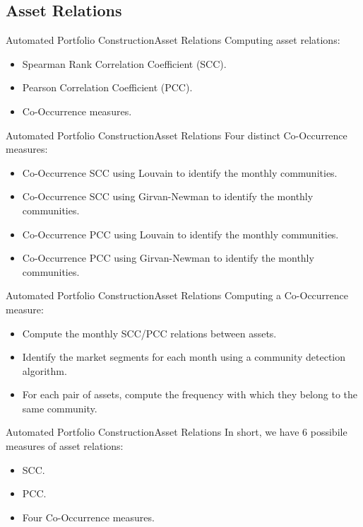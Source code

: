 \documentclass[bigger]{beamer}
\begin{document}
\subsection{Asset Relations}

\begin{frame}{Automated Portfolio Construction}{Asset Relations}
    Computing asset relations:
    \begin{itemize}
        \item<2-> Spearman Rank Correlation Coefficient (SCC).
        \item<3-> Pearson Correlation Coefficient (PCC).
        \item<4-> Co-Occurrence measures.
    \end{itemize}
\end{frame}

\begin{frame}{Automated Portfolio Construction}{Asset Relations}
    Four distinct Co-Occurrence measures:
    \begin{itemize}
        \item<2-> Co-Occurrence SCC using Louvain to identify the monthly communities.
        \item<3-> Co-Occurrence SCC using Girvan-Newman to identify the monthly communities.
        \item<4-> Co-Occurrence PCC using Louvain to identify the monthly communities.
        \item<5-> Co-Occurrence PCC using Girvan-Newman to identify the monthly communities.
    \end{itemize}
\end{frame}

\begin{frame}{Automated Portfolio Construction}{Asset Relations}
    Computing a Co-Occurrence measure:
    \begin{itemize}
        \item<2-> Compute the monthly SCC/PCC relations between assets.
        \item<3-> Identify the market segments for each month using a community detection algorithm.
        \item<4-> For each pair of assets, compute the frequency with which they belong to the same community.
    \end{itemize}
\end{frame}

\begin{frame}{Automated Portfolio Construction}{Asset Relations}
    In short, we have 6 possibile measures of asset relations:
    \begin{itemize}
        \item SCC.
        \item PCC.
        \item Four Co-Occurrence measures.
    \end{itemize}
\end{frame}
\end{document}
